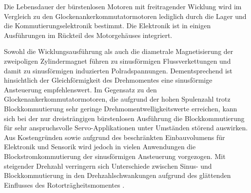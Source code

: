 Die Lebensdauer der bürstenlosen Motoren mit freitragender Wicklung wird im Vergleich zu den Glockenankerkommutatormotoren lediglich durch die Lager und die Kommutierungselektronik bestimmt. Die Elektronik ist in einigen Ausführungen im Rückteil des Motorgehäuses integriert.

Sowohl die Wicklungsausführung als auch die diametrale Magnetisierung der zweipoligen Zylindermagnet führen zu sinusförmigen Flussverkettungen und damit zu sinusförmigen induzierten Polradspannungen. Dementsprechend ist hinsichtlich der Gleichförmigkeit des Drehmomentes eine sinusförmige Ansteuerung empfehlenswert. Im Gegensatz zu den Glockenankerkommutatormotoren, die aufgrund der hohen Spulenzahl trotz Blockkommutierung sehr geringe Drehmomentwelligkeitswerte erreichen, kann sich bei der nur dreisträngigen bürstenlosen Ausführung die Blockkommutierung für sehr anspruchsvolle Servo-Applikationen unter Umständen störend auswirken. Aus Kostengründen sowie aufgrund des beschränkten Einbauvolumens für Elektronik und Sensorik wird jedoch in vielen Anwendungen die Blockstromkommutierung der sinusförmigen Ansteuerung vorgezogen. Mit steigender Drehzahl verringern sich Unterschiede zwischen Sinus- und Blockkommutierung in den Drehzahlschwankungen aufgrund des glättenden Einflusses des Rotorträgheitsmomentes \parencite[S. 78]{Stölting2011}.

